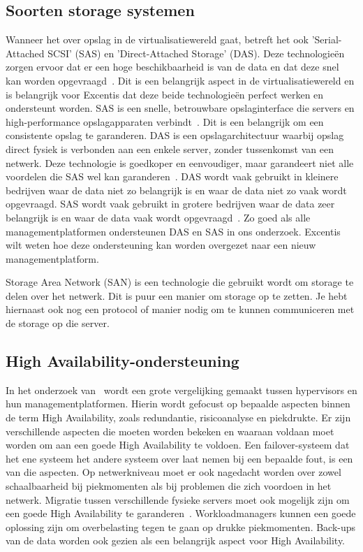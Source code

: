 \subsection{Soorten storage systemen}
Wanneer het over opslag in de virtualisatiewereld gaat, betreft het ook 'Serial-Attached SCSI' (SAS) en 'Direct-Attached Storage' (DAS). Deze technologieën zorgen ervoor dat er een hoge beschikbaarheid is van de data en dat deze snel kan worden opgevraagd~\autocite{griswold2002storage}. Dit is een belangrijk aspect in de virtualisatiewereld en is belangrijk voor Excentis dat deze beide technologieën perfect werken en ondersteunt worden.
SAS is een snelle, betrouwbare opslaginterface die servers en high-performance opslagapparaten verbindt~\autocite{aravindan2014performance}. Dit is een belangrijk om een consistente opslag te garanderen. DAS is een opslagarchitectuur waarbij opslag direct fysiek is verbonden aan een enkele server, zonder tussenkomst van een netwerk. Deze technologie is goedkoper en eenvoudiger, maar garandeert niet alle voordelen die SAS wel kan garanderen~\autocite{griswold2002storage}.
DAS wordt vaak gebruikt in kleinere bedrijven waar de data niet zo belangrijk is en waar de data niet zo vaak wordt opgevraagd. SAS wordt vaak gebruikt in grotere bedrijven waar de data zeer belangrijk is en waar de data vaak wordt opgevraagd~\autocite{griswold2002storage}.
Zo goed als alle managementplatformen ondersteunen DAS en SAS in ons onderzoek. Excentis wilt weten hoe deze ondersteuning kan worden overgezet naar een nieuw managementplatform.

Storage Area Network (SAN) \textcite{ibm2025san} is een technologie die gebruikt wordt om storage te delen over het netwerk.
Dit is puur een manier om storage op te zetten.
Je hebt hiernaast ook nog een protocol of manier nodig om te kunnen communiceren met de storage op die server.


\subsection{High Availability-ondersteuning}
In het onderzoek van~\textcite{dudnik2017creating} wordt een grote vergelijking gemaakt tussen hypervisors en hun managementplatformen. Hierin wordt gefocust op bepaalde aspecten binnen de term High Availability, zoals redundantie, risicoanalyse en piekdrukte.
Er zijn verschillende aspecten die moeten worden bekeken en waaraan voldaan moet worden om aan een goede High Availability te voldoen. Een failover-systeem dat het ene systeem het andere systeem over laat nemen bij een bepaalde fout, is een van die aspecten.
Op netwerkniveau moet er ook nagedacht worden over zowel schaalbaarheid bij piekmomenten als bij problemen die zich voordoen in het netwerk. Migratie tussen verschillende fysieke servers moet ook mogelijk zijn om een goede High Availability te garanderen~\autocite{dudnik2017creating}.
Workloadmanagers kunnen een goede oplossing zijn om overbelasting tegen te gaan op drukke piekmomenten. Back-ups van de data worden ook gezien als een belangrijk aspect voor High Availability.


